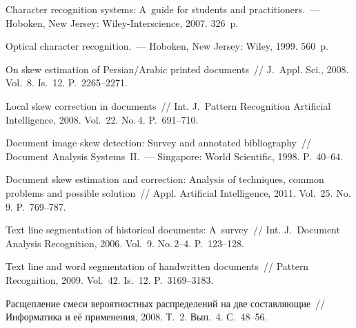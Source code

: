 \begin{multicols}{2}
{{\begin{thebibliography}{9}
   Character recognition systems: A~guide 
for students and practitioners.~--- Hoboken, New Jersey: Wiley-Interscience, 2007. 326~p.

   Optical character recognition.~--- Hoboken, New 
Jersey: Wiley, 1999. 560~p.

   On skew estimation of Persian/Arabic printed 
documents~// J.~Appl. Sci., 2008. Vol.~8. Is.~12. P.~2265--2271.

   Local skew correction in documents~// Int. J.~Pattern 
Recognition Artificial Intelligence, 2008. Vol.~22. No.\,4. P.~691--710.

   Document image skew detection: Survey and annotated bibliography~// 
Document Analysis Systems~II.~--- Singapore: World Scientific, 1998. P.~40--64.

   Document skew estimation and correction: Analysis of techniques, 
common problems and possible solution~// Appl. Artificial Intelligence, 2011.  Vol.~25. 
No.\,9. P.~769--787.

   Text line segmentation of historical 
documents: A~survey~// Int. J.~Document Analysis Recognition, 2006. Vol.~9. No.\,2--4. 
P.~123--128.

   Text line and word segmentation of 
handwritten documents~// Pattern Recognition, 2009. Vol.~42. Is.~12. P.~3169--3183.


\label{end\stat}

   Расщепление смеси вероятностных распределений на две 
составляющие~// Информатика и её применения, 2008. Т.~2. Вып.~4. С.~48--56.
\end{thebibliography}
}
}


\end{multicols}      